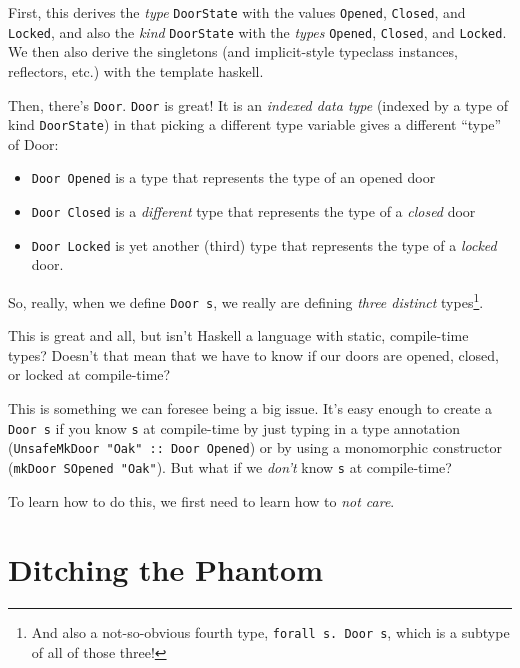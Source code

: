 \documentclass[]{article}
\begin{document}
First, this derives the \emph{type} \texttt{DoorState} with the values
\texttt{Opened}, \texttt{Closed}, and \texttt{Locked}, and also the \emph{kind}
\texttt{DoorState} with the \emph{types} \texttt{\textquotesingle{}Opened},
\texttt{\textquotesingle{}Closed}, and \texttt{\textquotesingle{}Locked}. We
then also derive the singletons (and implicit-style typeclass instances,
reflectors, etc.) with the template haskell.

Then, there's \texttt{Door}. \texttt{Door} is great! It is an \emph{indexed data
type} (indexed by a type of kind \texttt{DoorState}) in that picking a different
type variable gives a different ``type'' of Door:

\begin{itemize}
\tightlist
\item
  \texttt{Door\ \textquotesingle{}Opened} is a type that represents the type of
  an opened door
\item
  \texttt{Door\ \textquotesingle{}Closed} is a \emph{different} type that
  represents the type of a \emph{closed} door
\item
  \texttt{Door\ \textquotesingle{}Locked} is yet another (third) type that
  represents the type of a \emph{locked} door.
\end{itemize}

So, really, when we define \texttt{Door\ s}, we really are defining \emph{three
distinct} types\footnote{And also a not-so-obvious fourth type,
  \texttt{forall\ s.\ Door\ s}, which is a subtype of all of those three!}.

This is great and all, but isn't Haskell a language with static, compile-time
types? Doesn't that mean that we have to know if our doors are opened, closed,
or locked at compile-time?

This is something we can foresee being a big issue. It's easy enough to create a
\texttt{Door\ s} if you know \texttt{s} at compile-time by just typing in a type
annotation (\texttt{UnsafeMkDoor\ "Oak"\ ::\ Door\ \textquotesingle{}Opened}) or
by using a monomorphic constructor (\texttt{mkDoor\ SOpened\ "Oak"}). But what
if we \emph{don't} know \texttt{s} at compile-time?

To learn how to do this, we first need to learn how to \emph{not care}.

\hypertarget{ditching-the-phantom}{%
\section{Ditching the Phantom}\label{ditching-the-phantom}}
\end{document}
